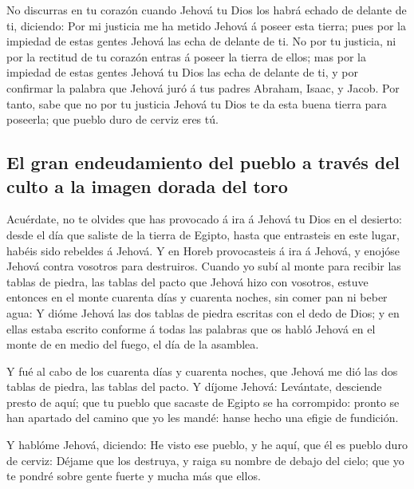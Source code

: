  No discurras en tu corazón cuando Jehová tu Dios los habrá
echado de delante de ti, diciendo: Por mi justicia me ha metido Jehová á
poseer esta tierra; pues por la impiedad de estas gentes Jehová las echa
de delante de ti.  No por tu justicia, ni por la rectitud de
tu corazón entras á poseer la tierra de ellos; mas por la impiedad de
estas gentes Jehová tu Dios las echa de delante de ti, y por confirmar
la palabra que Jehová juró á tus padres Abraham, Isaac, y Jacob.
 Por tanto, sabe que no por tu justicia Jehová tu Dios te da
esta buena tierra para poseerla; que pueblo duro de cerviz eres tú.

\hypertarget{el-gran-endeudamiento-del-pueblo-a-travuxe9s-del-culto-a-la-imagen-dorada-del-toro}{%
\subsection{El gran endeudamiento del pueblo a través del culto a la
imagen dorada del
toro}\label{el-gran-endeudamiento-del-pueblo-a-travuxe9s-del-culto-a-la-imagen-dorada-del-toro}}

 Acuérdate, no te olvides que has provocado á ira á Jehová
tu Dios en el desierto: desde el día que saliste de la tierra de Egipto,
hasta que entrasteis en este lugar, habéis sido rebeldes á Jehová.
 Y en Horeb provocasteis á ira á Jehová, y enojóse Jehová
contra vosotros para destruiros.  Cuando yo subí al monte
para recibir las tablas de piedra, las tablas del pacto que Jehová hizo
con vosotros, estuve entonces en el monte cuarenta días y cuarenta
noches, sin comer pan ni beber agua:  Y dióme Jehová las
dos tablas de piedra escritas con el dedo de Dios; y en ellas estaba
escrito conforme á todas las palabras que os habló Jehová en el monte de
en medio del fuego, el día de la asamblea.

 Y fué al cabo de los cuarenta días y cuarenta noches, que
Jehová me dió las dos tablas de piedra, las tablas del pacto.
 Y díjome Jehová: Levántate, desciende presto de aquí; que
tu pueblo que sacaste de Egipto se ha corrompido: pronto se han apartado
del camino que yo les mandé: hanse hecho una efigie de fundición.

 Y hablóme Jehová, diciendo: He visto ese pueblo, y he
aquí, que él es pueblo duro de cerviz:  Déjame que los
destruya, y raiga su nombre de debajo del cielo; que yo te pondré sobre
gente fuerte y mucha más que ellos.

